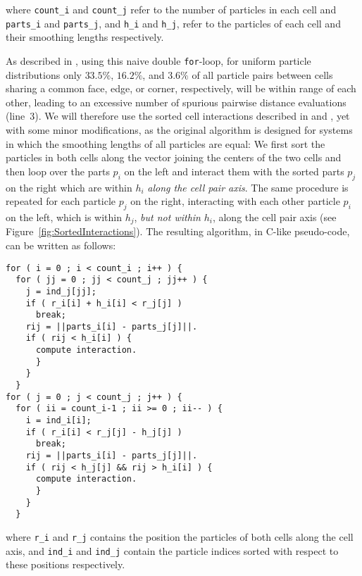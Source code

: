 \documentclass[a4paper,conference]{IEEEtran}
\newcommand{\fig}[1]
    {Figure~\ref{fig:#1}}
\begin{document}
\noindent where {\tt count\_i} and {\tt count\_j} refer to
the number of particles in each cell and {\tt parts\_i} and
{\tt parts\_j}, and {\tt h\_i} and {\tt h\_j}, refer to the
particles of each cell and their smoothing lengths respectively.

As described in \cite{ref:Gonnet2007}, using this
naive double {\tt for}-loop, for uniform particle
distributions only $33.5\%$, $16.2\%$,
and $3.6\%$ of all particle
pairs between cells sharing a common face, edge, or corner, respectively,
will be within range of each other, leading
to an excessive number of spurious pairwise distance evaluations (line~3).
We will therefore use the sorted cell
interactions described in \cite{ref:Gonnet2007} and \cite{ref:Gonnet2013},
yet with some minor modifications, as
the original algorithm is designed for systems in which the
smoothing lengths of all particles are equal:
We first sort the particles in both cells along the vector joining
the centers of the two cells and then loop over the
parts $p_i$ on the left and interact them with the sorted parts $p_j$
on the right which are within $h_i$ {\em along the cell pair axis}.
The same procedure is repeated for each particle $p_j$ on the
right, interacting with each other particle $p_i$ on the
left, which is within $h_j$, {\em but not within} $h_i$, along
the cell pair axis (see \fig{SortedInteractions}).
The resulting algorithm, in C-like pseudo-code, can be written as follows:
        
\begin{center}\begin{minipage}{0.9\columnwidth}
    \begin{lstlisting}
for ( i = 0 ; i < count_i ; i++ ) {
  for ( jj = 0 ; jj < count_j ; jj++ ) {
    j = ind_j[jj];
    if ( r_i[i] + h_i[i] < r_j[j] )
      break;
    rij = ||parts_i[i] - parts_j[j]||.
    if ( rij < h_i[i] ) {
      compute interaction.
      }
    }
  }
for ( j = 0 ; j < count_j ; j++ ) {
  for ( ii = count_i-1 ; ii >= 0 ; ii-- ) {
    i = ind_i[i];
    if ( r_i[i] < r_j[j] - h_j[j] )
      break;
    rij = ||parts_i[i] - parts_j[j]||.
    if ( rij < h_j[j] && rij > h_i[i] ) {
      compute interaction.
      }
    }
  }
    \end{lstlisting}
\end{minipage}\end{center}
        
\noindent where {\tt r\_i} and {\tt r\_j} contains the position
the particles of both cells along the cell axis, and
{\tt ind\_i} and {\tt ind\_j} contain the particle indices
sorted with respect to these positions respectively.
\end{document}
